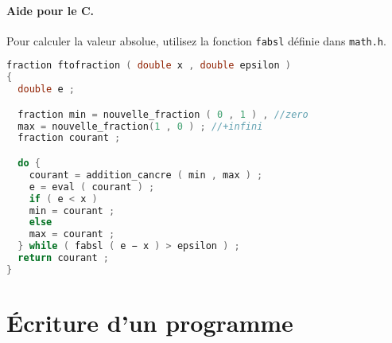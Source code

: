 \paragraph{Aide pour le C.} Pour
calculer la valeur absolue, utilisez la fonction \texttt{fabsl} définie dans
\texttt{math.h}.  

\begin{solutioncachee}
  \begin{lstlisting}[language=C]
fraction ftofraction ( double x , double epsilon ) 
{ 
  double e ;

  fraction min = nouvelle_fraction ( 0 , 1 ) , //zero
  max = nouvelle_fraction(1 , 0 ) ; //+infini
  fraction courant ;

  do {
    courant = addition_cancre ( min , max ) ;
    e = eval ( courant ) ;
    if ( e < x )
    min = courant ;
    else
    max = courant ;
  } while ( fabsl ( e − x ) > epsilon ) ;
  return courant ;
}
\end{lstlisting}
\end{solutioncachee}



\section{Écriture d’un programme}

